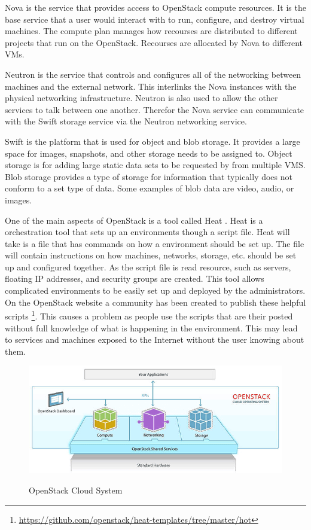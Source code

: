 \documentclass[12pt]{article}
\begin{document}
Nova is the service that provides access to OpenStack compute resources. It is the base service that a user would interact with to run, configure, and destroy virtual machines. The compute plan manages how recourses are distributed to different projects that run on the OpenStack. Recourses are allocated by Nova to different VMs.

Neutron is the service that controls and configures all of the networking between machines and the external network. This interlinks the Nova instances with the physical networking infrastructure. Neutron is also used to allow the other services to talk between one another. Therefor the Nova service can communicate with the Swift storage service via the Neutron networking service.

Swift is the platform that is used for object and blob storage. It provides a large space for images, snapshots, and other storage needs to be assigned to. Object storage is for adding large static data sets to be requested by from multiple VMS. Blob storage provides a type of storage for information that typically does not conform to a set type of data. Some examples of blob data are video, audio, or images.

One of the main aspects of OpenStack is a tool called Heat \cite{HeatOS}. Heat is a orchestration tool that sets up an environments though a script file. Heat will take is a file that has commands on how a environment should be set up. The file will contain instructions on how machines, networks, storage, etc. should be set up and configured together. As the script file is read resource, such as servers, floating IP addresses, and security groups are created. This tool allows complicated environments to be easily set up and deployed by the administrators. On the OpenStack website a community has been created to publish these helpful scripts \footnote{\href{https://github.com/openstack/heat-templates/tree/master/hot}{https://github.com/openstack/heat-templates/tree/master/hot}}. This causes a problem as people use the scripts that are their posted without full knowledge of what is happening in the environment. This may lead to services and machines exposed to the Internet without the user knowing about them.
\begin{figure}[H]
    \centering
    \includegraphics[scale=.6]{./pic/openstack-sm.png}
    \label{fig:OpenStack}
    \caption{OpenStack Cloud System}
\end{figure}
\end{document}

